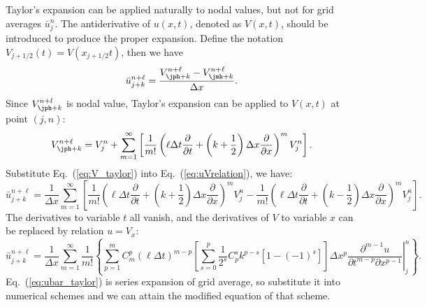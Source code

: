 \documentclass[]{article}
\begin{document}
Taylor's expansion can be applied naturally to nodal values, but not for
grid averages $\bar u_j^n$. The antiderivative of $u(x,t)$, 
denoted as $V(x,t)$,
should be introduced to produce the proper expansion. Define the notation
$V_{j+1/2}(t)=V(x_{j+1/2}t)$, then we have
\begin{equation}
    \bar u_{j+k}^{n+\ell}=
    \frac{V_{\jph+k}^{n+\ell}-V_{\jmh+k}^{n+\ell}}{\Delta x}.
    \label{eq:uVrelation}
\end{equation}
Since $V_{\jph+k}^{n+l}$ is nodal value, Taylor's expansion can be
applied to $V(x,t)$ at point $(j,n)$:
\begin{equation}
    V_{\jph+k}^{n+\ell} = V_{j}^n + \sum_{m=1}^{\infty}
    \left[ 
    \frac{1}{m!} 
    \left(
    \ell\Delta t \frac{\partial}{\partial t} + 
    \left(k+\frac{1}{2}\right) \Delta x\frac{\partial}{\partial x}
    \right)^m V_j^n
    \right].
    \label{eq:V_taylor}
\end{equation}
Substitute Eq.~(\ref{eq:V_taylor}) into Eq.~(\ref{eq:uVrelation}), we
have:
\begin{equation}
    \bar u_{j+k}^{n+\ell} = \frac{1}{\Delta x} \sum_{m=1}^{\infty} 
    \left[
    \frac{1}{m!}\left( \ell\Delta t\frac{\partial}{\partial t} +
    \left(k+\frac{1}{2}\right)\Delta x\frac{\partial}{\partial x}\right)^m 
    V_j^n -
    \frac{1}{m!}\left(\ell\Delta t\frac{\partial}{\partial t} +
    \left(k-\frac{1}{2}\right)\Delta x\frac{\partial}{\partial x}\right)^m 
    V_j^n
    \right].
    \label{eq:uVrelation2}
\end{equation}
The derivatives to variable $t$ all vanish, and the derivatives of $V$ to
variable $x$ can be replaced by relation $u=V_x$:
\begin{equation}
    \bar u_{j+k}^{n+\ell} = \frac{1}{\Delta x} \sum_{m=1}^{\infty}\frac{1}{m!}
    \left\{
    \sum_{p=1}^m C_m^p(\ell\Delta t)^{m-p} 
    \left[
        \sum_{s=0}^p \frac{1}{2^s}C_p^s k^{p-s}\left[1-(-1)^s\right]
    \right]
    \Delta x^p 
    \left. 
    \frac{\partial ^{m-1}u}{\partial t^{m-p}\partial x^{p-1}}
    \right|_j^n
    \right\}.
    \label{eq:ubar_taylor}
\end{equation}
Eq.~(\ref{eq:ubar_taylor}) is series expansion of
grid average, so substitute it into numerical schemes and we can
attain the modified equation of that scheme.
\end{document}
